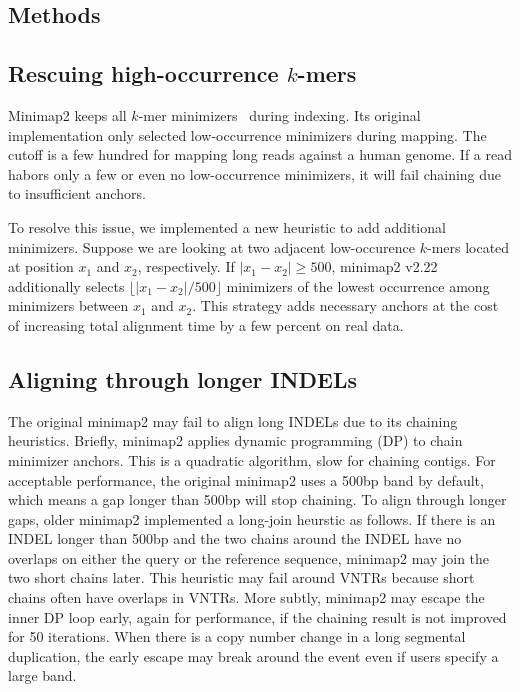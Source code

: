 \documentclass{bioinfo}
\begin{document}
\begin{methods}
\section{Methods}

\subsection{Rescuing high-occurrence $k$-mers}
Minimap2 keeps all $k$-mer minimizers~\citep{Roberts:2004fv} during indexing. Its original
implementation only selected low-occurrence minimizers during mapping. The
cutoff is a few hundred for mapping long reads against a human genome. If a
read habors only a few or even no low-occurrence minimizers, it will fail
chaining due to insufficient anchors.

To resolve this issue, we implemented a new heuristic to add additional
minimizers. Suppose we are looking at two adjacent low-occurence $k$-mers
located at position $x_1$ and $x_2$, respectively. If $|x_1-x_2|\ge500$,
minimap2 v2.22 additionally selects $\lfloor|x_1-x_2|/500\rfloor$ minimizers
of the lowest occurrence among minimizers between $x_1$ and $x_2$.
This strategy adds necessary anchors at the cost of increasing total alignment
time by a few percent on real data.

\subsection{Aligning through longer INDELs}
The original minimap2 may fail to align long INDELs due to its chaining
heuristics. Briefly, minimap2 applies dynamic programming (DP) to chain
minimizer anchors. This is a quadratic algorithm, slow for chaining
contigs. For acceptable performance, the original minimap2 uses a 500bp band by
default, which means a gap longer than 500bp will stop chaining.
To align through longer gaps, older minimap2 implemented a long-join heurstic as follows.
If there is an INDEL longer than 500bp and the two chains around the INDEL
have no overlaps on either the query or the reference sequence, minimap2 may
join the two short chains later.
This heuristic may fail around VNTRs because short chains
often have overlaps in VNTRs. More subtly, minimap2 may escape the inner DP
loop early, again for performance, if the chaining result is not improved for
50 iterations. When there is a copy number change in a long segmental
duplication, the early escape may break around the event even if users
specify a large band.


\end{methods}
\end{document}
